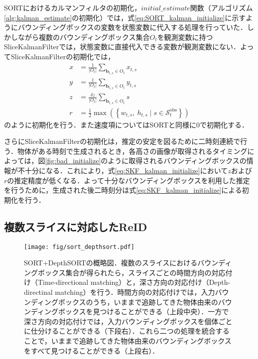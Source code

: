             SORTにおけるカルマンフィルタの初期化，$initial\_estimate$関数（アルゴリズム\ref{alg:kalman_estimate}の初期化）では，式\ref{eq:SORT_kalman_initialize}に示すようにバウンディングボックスの変数を状態変数に代入する処理を行っていた．しかしながら複数のバウンディングボックス集合$O_t$を観測変数に持つSliceKalmanFilterでは，状態変数に直接代入できる変数が観測変数にない．よってSliceKalmanFilterの初期化では，
            \begin{equation}
                \label{eq:SKF_kalman_initialize}
                \begin{aligned}
                    x &= \frac{1}{\left|O_t\right|} \sum_{\bm{b}_{t,s} \in O_t} x_{t,s}
                    \\ y &= \frac{1}{\left|O_t\right|} \sum_{\bm{b}_{t,s} \in O_t} y_{t,s}
                    \\ z &= \frac{\delta z}{\left|O_t\right|} \sum_{\bm{b}_{t,s} \in O_t} s 
                    \\ r &= \frac{1}{2} \max \left(\left\{w_{t,s}, ~ h_{t,s} \mid s \in \mathcal{S}_t^{\text{obs}}\right\}\right)
                \end{aligned}
            \end{equation}
            のように初期化を行う．また速度項についてはSORTと同様に$0$で初期化する．

            さらにSliceKalmanFilterの初期化は，推定の安定を図るために二時刻連続で行う．物体がある時刻で生成されるとき，各高さの画像が取得されるタイミングによっては，図\ref{fig:bad_initialize}のように取得されるバウンディングボックスの情報が不十分になる．これにより，式\ref{eq:SKF_kalman_initialize}において$z$および$r$の推定精度が低くなる．よって十分なバウンディングボックスを利用した推定を行うために，生成された後二時刻分は式\ref{eq:SKF_kalman_initialize}による初期化を行う．

    \subsection{複数スライスに対応したReID}
    \label{subsec:re-identificataion_for_slice}

    \begin{figure}[t]
        \centering
        \texttt{[image: fig/sort\_depthsort.pdf]}
        \caption[SORT+DepthSORTの概略図]{SORT+DepthSORTの概略図．複数のスライスにおけるバウンディングボックス集合が得られたら，スライスごとの時間方向の対応付け（Time-directional matching）と，深さ方向の対応付け（Depth-directinal matching）を行う．時間方向の対応付けでは，入力バウンディングボックスのうち，いままで追跡してきた物体由来のバウンディングボックスを見つけることができる（上段中央）．一方で深さ方向の対応付けでは，入力バウンディングボックスを個体ごとに仕分けることができる（下段右）．これら二つの処理を統合することで，いままで追跡してきた物体由来のバウンディングボックスをすべて見つけることができる（上段右）．}
        \label{fig:sort_depthsort}
    \end{figure}

